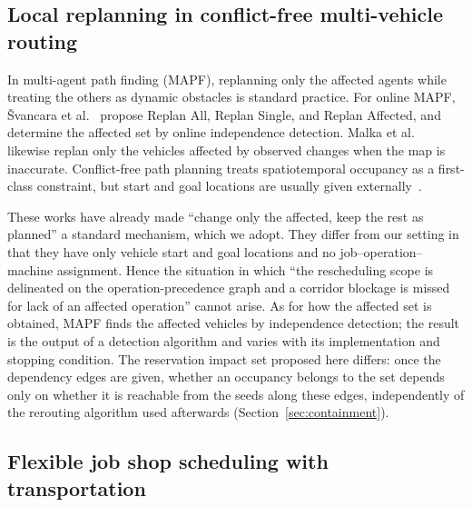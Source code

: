 \subsection{Local replanning in conflict-free multi-vehicle routing}
\label{sec:rw_mapf}

In multi-agent path finding (MAPF), replanning only the affected agents while treating the others as dynamic obstacles is standard practice.
For online MAPF, \v{S}vancara et al.~\cite{svancara2019online} propose
Replan All, Replan Single, and Replan Affected, and determine the affected set by online independence detection.
Malka et al.~\cite{malka2024online} likewise replan only the vehicles affected by observed changes when the map is inaccurate.
Conflict-free path planning treats spatiotemporal occupancy as a first-class constraint, but start and goal locations are usually given externally~\cite{zhang2024guidance}.

These works have already made ``change only the affected, keep the rest as planned'' a standard mechanism, which we adopt.
They differ from our setting in that they have only vehicle start and goal locations and no job--operation--machine assignment.
Hence the situation in which ``the rescheduling scope is delineated on the operation-precedence graph and a corridor blockage is missed for lack of an affected operation'' cannot arise.
As for how the affected set is obtained, MAPF finds the affected vehicles by independence detection; the result is the output of a detection algorithm and varies with its implementation and stopping condition.
The reservation impact set proposed here differs: once the dependency edges are given, whether an occupancy belongs to the set
depends only on whether it is reachable from the seeds along these edges, independently of the rerouting algorithm used afterwards
(Section~\ref{sec:containment}).

\subsection{Flexible job shop scheduling with transportation}
\label{sec:rw_position}

